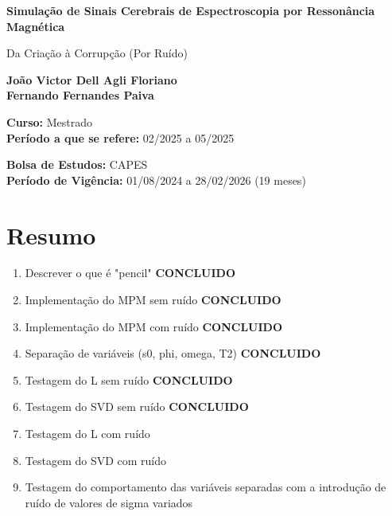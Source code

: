 \documentclass[12pt]{article}
\begin{document}
\begin{titlepage}
    \begin{center}
        \vspace*{1cm}
            
        \Huge
        \textbf{Simulação de Sinais Cerebrais de Espectroscopia por 
        Ressonância Magnética}
            
        \vspace{0.5cm}
        \LARGE
        Da Criação à Corrupção (Por Ruído)
            
        \vspace{1.5cm}
            
        \textbf{João Victor Dell Agli Floriano \\ Fernando Fernandes Paiva}

            
        \vfill
            
        \textbf{Curso:} Mestrado \\
        \textbf{Período a que se refere:} 02/2025 a 05/2025
            
        \vspace{0.8cm}
            
        \Large
        \textbf{Bolsa de Estudos:} CAPES \\
        \textbf{Período de Vigência:} 01/08/2024 a 28/02/2026 (19 meses)
            
    \end{center}
\end{titlepage}


\section{Resumo}

\begin{enumerate}
    \item Descrever o que é "pencil" \textbf{CONCLUIDO}
    \item Implementação do MPM sem ruído \textbf{CONCLUIDO}
    \item Implementação do MPM com ruído \textbf{CONCLUIDO}
    \item Separação de variáveis (s0, phi, omega, T2) \textbf{CONCLUIDO}
    \item Testagem do L sem ruído \textbf{CONCLUIDO}
    \item Testagem do SVD sem ruído \textbf{CONCLUIDO}
    \item Testagem do L com ruído 
    \item Testagem do SVD com ruído
    \item Testagem do comportamento das variáveis separadas com a introdução de ruído de valores de sigma variados
\end{enumerate}
\end{document}
